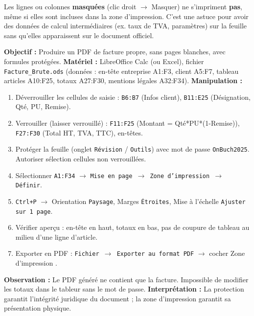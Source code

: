 \documentclass[11pt]{article}
\begin{document}
\begin{attention}
Les lignes ou colonnes \textbf{masquées} (clic droit $\rightarrow$ Masquer) ne s'impriment \textbf{pas}, même si elles sont incluses dans la zone d'impression. C'est une astuce pour avoir des données de calcul intermédiaires (ex. taux de TVA, paramètres) sur la feuille sans qu'elles apparaissent sur le document officiel.
\end{attention}

\begin{experience}
\textbf{Objectif :} Produire un PDF de facture propre, sans pages blanches, avec formules protégées.
\textbf{Matériel :} LibreOffice Calc (ou Excel), fichier \texttt{Facture\_Brute.ods} (données : en-tête entreprise A1:F3, client A5:F7, tableau articles A10:F25, totaux A27:F30, mentions légales A32:F34).
\textbf{Manipulation :}
\begin{enumerate}
    \item Déverrouiller les cellules de saisie : \texttt{B6:B7} (Infos client), \texttt{B11:E25} (Désignation, Qté, PU, Remise).
    \item Verrouiller (laisser verrouillé) : \texttt{F11:F25} (Montant = Qté*PU*(1-Remise)), \texttt{F27:F30} (Total HT, TVA, TTC), en-têtes.
    \item Protéger la feuille (onglet \texttt{Révision} / \texttt{Outils}) avec mot de passe \texttt{OnBuch2025}. Autoriser sélection cellules non verrouillées.
    \item Sélectionner \texttt{A1:F34} $\rightarrow$ \texttt{Mise en page $\rightarrow$ Zone d'impression $\rightarrow$ Définir}.
    \item \texttt{Ctrl+P} $\rightarrow$ Orientation \texttt{Paysage}, Marges \texttt{Étroites}, Mise à l'échelle \texttt{Ajuster sur 1 page}.
    \item Vérifier aperçu : en-tête en haut, totaux en bas, pas de coupure de tableau au milieu d'une ligne d'article.
    \item Exporter en PDF : \texttt{Fichier $\rightarrow$ Exporter au format PDF} $\rightarrow$ cocher \og Zone d'impression \fg.
\end{enumerate}
\textbf{Observation :} Le PDF généré ne contient que la facture. Impossible de modifier les totaux dans le tableur sans le mot de passe.
\textbf{Interprétation :} La protection garantit l'intégrité juridique du document ; la zone d'impression garantit sa présentation physique.
\end{experience}
\end{document}
